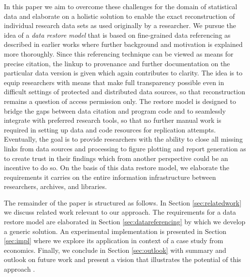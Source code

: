 \documentclass{sig-alternate}
\begin{document}
In this paper we aim to overcome these challenges for the domain of statistical data and elaborate on a holistic solution to enable the exact reconstruction of individual research data sets as used originally by a researcher.
We pursue the idea of a \emph{data restore model} that is based on fine-grained data referencing as described in earlier works \cite{BahlsTochtermann_2012}
where further background and motivation is explained more thoroughly.
Since this referencing technique can be viewed as means for precise citation, the linkup to provenance and further documentation on the particular data version is given which again contributes to clarity.
The idea is to equip researchers with means that make full transparency possible even in difficult settings of protected and distributed data sources, so that reconstruction remains a question of access permission only.
The restore model is designed to bridge the gaps between data citation and program code and to seamlessly integrate with preferred research tools, so that no further manual work is required in setting up data and code resources for replication attempts.
Eventually, the goal is to provide researchers with the ability to close all missing links from data sources and processing to figure plotting and report generation as to create trust in their findings which from another perspective could be an incentive to do so.
On the basis of this data restore model, we elaborate the requirements it carries on the entire information infrastructure between researchers, archives, and libraries.


 
The remainder of the paper is structured as follows. 
In Section \ref{sec:relatedwork} we discuss related work relevant to our approach. 
The requirements for a data restore model are elaborated in Section \ref{sec:datareferencing} by which we develop a generic solution.
An experimental implementation is presented in Section \ref{sec:impl} where we explore its application in context of a case study from economics.
Finally, we conclude in Section \ref{sec:outlook} with summary and outlook on future work and present a vision that illustrates the potential of this approach .
\end{document}
